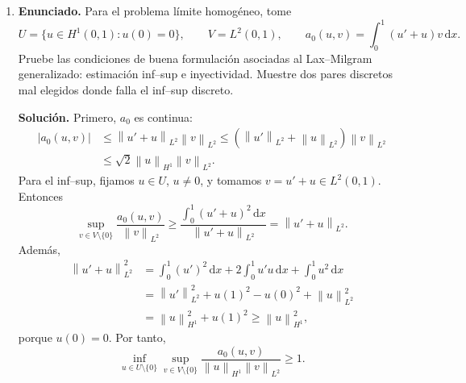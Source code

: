 \documentclass[11pt]{article}
\newcommand{\norm}[1]{\left\lVert #1\right\rVert}
\newcommand{\abs}[1]{\left|#1\right|}
\def\dx{\mbox{\(\,\mathrm{d}x\)}}
\begin{document}
\begin{enumerate}[label=\textbf{\arabic*.}, leftmargin=*]
\begin{enumerate}[label=(\alph*), leftmargin=*]
    \textbf{Solución.} Si $\varepsilon=0$, queda
    \[
        u_0'+u_0=f.
    \]
    Esta es una ecuación diferencial de primer orden. Como el coeficiente advectivo es positivo, el dato compatible es el dato de entrada:
    \[
        u_0(0)=g_0.
    \]
    Resolviendo por factor integrante,
    \[
        (e^xu_0)'=e^xf,
    \]
    y por tanto
    \[
        u_0(x)=e^{-x}g_0+\int_0^xe^{-(x-s)}f(s)\,ds.
    \]
    El valor en $x=1$ queda determinado por $f$ y $g_0$:
    \[
        u_0(1)=e^{-1}g_0+\int_0^1e^{-(1-s)}f(s)\,ds.
    \]
    En general este valor no coincide con $g_1$. Por eso, al perderse el término de segundo orden, ya no se pueden imponer simultáneamente ambos datos de borde salvo que satisfagan una condición de compatibilidad especial.

    \item \textbf{Enunciado.} Para el problema límite homogéneo, tome
    \[
        U=\{u\in H^1(0,1):u(0)=0\},
        \qquad
        V=L^2(0,1),
        \qquad
        a_0(u,v)=\int_0^1(u'+u)v\dx.
    \]
    Pruebe las condiciones de buena formulación asociadas al Lax--Milgram generalizado: estimación inf--sup e inyectividad. Muestre dos pares discretos mal elegidos donde falla el inf--sup discreto.

    \textbf{Solución.} Primero, $a_0$ es continua:
    \[
    \begin{aligned}
        \abs{a_0(u,v)}
        &\le
        \norm{u'+u}_{L^2}\norm{v}_{L^2}
        \le
        (\norm{u'}_{L^2}+\norm{u}_{L^2})\norm{v}_{L^2}\\
        &\le
        \sqrt2\norm{u}_{H^1}\norm{v}_{L^2}.
    \end{aligned}
    \]
    Para el inf--sup, fijamos $u\in U$, $u\ne0$, y tomamos $v=u'+u\in L^2(0,1)$. Entonces
    \[
        \sup_{v\in V\setminus\{0\}}
        \frac{a_0(u,v)}{\norm{v}_{L^2}}
        \ge
        \frac{\int_0^1(u'+u)^2\dx}{\norm{u'+u}_{L^2}}
        =
        \norm{u'+u}_{L^2}.
    \]
    Además,
    \[
    \begin{aligned}
        \norm{u'+u}_{L^2}^2
        &=
        \int_0^1(u')^2\dx+2\int_0^1u'u\dx+
        \int_0^1u^2\dx\\
        &=
        \norm{u'}_{L^2}^2+u(1)^2-u(0)^2+
\norm{u}_{L^2}^2\\
        &=
        \norm{u}_{H^1}^2+u(1)^2
        \ge
        \norm{u}_{H^1}^2,
    \end{aligned}
    \]
    porque $u(0)=0$. Por tanto,
    \[
        \inf_{u\in U\setminus\{0\}}
        \sup_{v\in V\setminus\{0\}}
        \frac{a_0(u,v)}{\norm{u}_{H^1}\norm{v}_{L^2}}
        \ge1.
    \]


\end{enumerate}
\end{enumerate}
\end{document}
